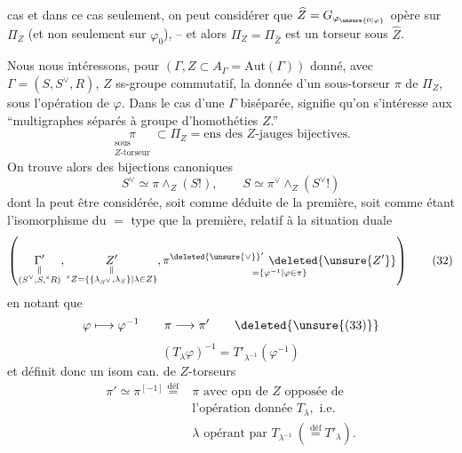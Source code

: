 cas et dans ce cas seulement, on peut considérer
que $\widehat Z=G_{\varphi_{\unsure{0|\varphi}}}$ opère sur $\Pi_Z$ (et non seulement sur $\varphi_0$),
-- et alors $\Pi_Z=\Pi_{\widehat Z}$ est un torseur sous $\widehat Z$.

Nous nous intéressons, pour $(\Gamma,Z\subset A_\Gamma=\mathrm{Aut}(\Gamma))$
donné, avec $\Gamma=(S,S^\vee,R)$, $Z$ ss-groupe commutatif,
  la donnée d'un sous-torseur $\pi$ de $\Pi_Z$,
sous l'opération de $\varphi$. Dans le cas d'une
$\Gamma$ biséparée,  signifie qu'on s'intéresse aux
``multigraphes séparés à groupe d'homothéties $Z$.''
\[
 \underset{\substack{\text{sous}\\Z\text{-torseur}}}{\pi}\subset\Pi_Z=\text{ens des } Z\text{-jauges bijectives}.
 \tag*{(30)}
\]
On trouve alors des bijections canoniques
\[
 S^\vee\simeq\pi\wedge_Z(S!),\qquad S\simeq\pi^\vee\wedge_Z(S^\vee!)
 \tag*{(31)}
\]
dont la  peut être considérée, soit comme
déduite de la première, soit comme étant
l'isomorphisme du $=$ type que la première,
relatif à la situation duale
\[
 \left(\underset{\substack{\Vert\\(S^\vee,S,{}^sR)}}{\Gamma'},
 \underset{\substack{\Vert\\ {}^sZ=\{\{\lambda_{S^\vee},\lambda_S\}\mid\lambda\in Z\}}}{Z'},
 \underset{=\{\varphi^{-1}\mid\varphi\in\pi\}}{\pi^{\deleted{\unsure{\vee}}'}\ \deleted{\unsure{Z'}}}\right)
 \tag*{(32)}
\]
en notant que
\[
 \varphi\longmapsto\varphi^{-1}\qquad \pi\longrightarrow\pi'
 \tag*{\deleted{\unsure{(33)}}}
\]
 
\[
 (T_\lambda\varphi)^{-1}=T'_{\lambda^{-1}}(\varphi^{-1})
\]
et définit donc un isom can. de $Z$-torseurs
\[
\begin{aligned}
 \pi'\simeq\pi^{[-1]}\overset{\mathrm{déf}}={}&\pi\text{ avec opn de }Z\text{ opposée de}\\
 &\text{l'opération donnée } T_\lambda,\text{ i.e.}\\
 &\lambda\text{ opérant par }T_{\lambda^{-1}}\ (\overset{\mathrm{déf}}=T'_\lambda).
\end{aligned}\tag*{(33)}
\]


